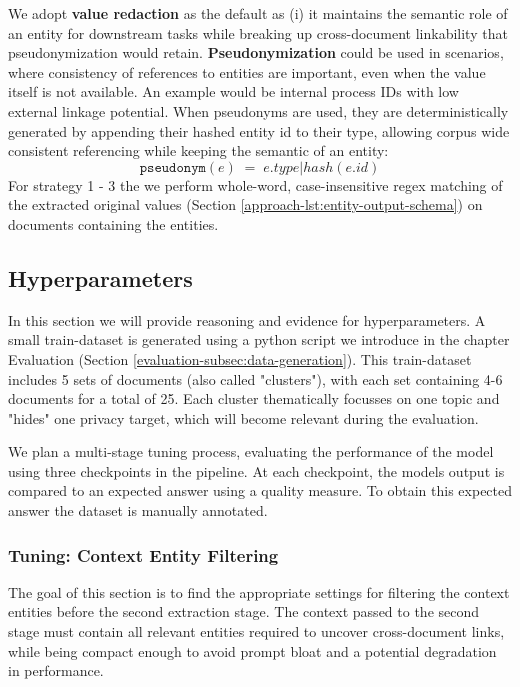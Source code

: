 We adopt \textbf{value redaction} as the default as (i) it maintains the semantic role of an entity for downstream tasks while breaking up cross-document linkability that pseudonymization would retain. \textbf{Pseudonymization} could be used in scenarios, where consistency of references to entities are important, even when the value itself is not available. An example would be internal process IDs with low external linkage potential. When pseudonyms are used, they are deterministically generated by appending their hashed entity id to their type, allowing corpus wide consistent referencing while keeping the semantic of an entity:
\[
    \texttt{pseudonym}(e) \;=\; e.type \vert hash(e.id)
\]
For strategy 1 - 3 the we perform whole-word, case-insensitive regex matching of the extracted original values (Section \ref{approach-lst:entity-output-schema}) on documents containing the entities.


\subsection{Hyperparameters} \label{approach-subsec:hyperparams}
In this section we will provide reasoning and evidence for hyperparameters. A small train-dataset is generated using a python script we introduce in the chapter Evaluation (Section \ref{evaluation-subsec:data-generation}). This train-dataset includes 5 sets of documents (also called "clusters"), with each set containing 4-6 documents for a total of 25. Each cluster thematically focusses on one topic and "hides" one privacy target, which will become relevant during the evaluation.

We plan a multi-stage tuning process, evaluating the performance of the model using three checkpoints in the pipeline. At each checkpoint, the models output is compared to an expected answer using a quality measure. To obtain this expected answer the dataset is manually annotated.

\subsubsection{Tuning: Context Entity Filtering}\label{approach-subsubsec:entity_filter}
The goal of this section is to find the appropriate settings for filtering the context entities before the second extraction stage. The context passed to the second stage must contain all relevant entities required to uncover cross-document links, while being compact enough to avoid prompt bloat and a potential degradation in performance.

